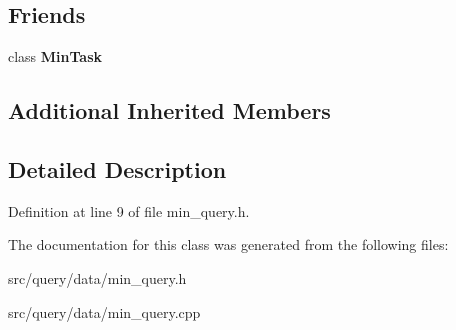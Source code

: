 \subsection*{Friends}
\begin{DoxyCompactItemize}
\item 
\mbox{\label{class_min_query_a038d2f25dbf55e5ca51c363822716600}} 
class {\bfseries Min\+Task}
\end{DoxyCompactItemize}
\subsection*{Additional Inherited Members}


\subsection{Detailed Description}


Definition at line 9 of file min\+\_\+query.\+h.



The documentation for this class was generated from the following files\+:\begin{DoxyCompactItemize}
\item 
src/query/data/min\+\_\+query.\+h\item 
src/query/data/min\+\_\+query.\+cpp\end{DoxyCompactItemize}

